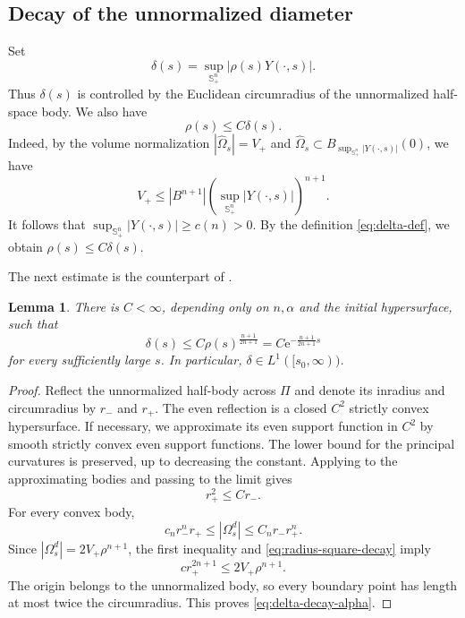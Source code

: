 \documentclass[11pt, reqno]{amsart}
\newtheorem{lemma}[theorem]{Lemma}
\theoremstyle{remark}
\theoremstyle{definition}
\numberwithin{equation}{section}
\newcommand{\Sph}{\mathbb S}
\newcommand{\PiH}{\Pi}
\begin{document}
\subsection{Decay of the unnormalized diameter}
\label{sub5.2}
Set
\begin{equation}\label{eq:delta-def}
        \delta(s)=\sup_{\Sph^n_+}|\rho(s)Y(\cdot,s)|.
\end{equation}
Thus $\delta(s)$ is controlled by the Euclidean circumradius of the
unnormalized half-space body. We also have
\begin{equation*}
    \rho(s)\leq C\delta(s).
\end{equation*}
Indeed, by the volume normalization $|\widehat\Omega_s|=V_+$ and  $ \widehat\Omega_s
 \subset  B_{\sup_{\mathbb S^n_+}|Y(\cdot,s)|}(0)$, 
we have
\begin{equation*}
 V_+
 \leq
 |B^{n+1}|
 \left(\sup_{\mathbb S^n_+}|Y(\cdot,s)|\right)^{n+1}.
\end{equation*}
It follows that $ \sup_{\mathbb S^n_+}|Y(\cdot,s)|
 \geq c(n)>0$.  
By the definition \eqref{eq:delta-def}, 
we obtain $\rho(s)\leq C\delta(s)$.

The next estimate is the counterpart of
\cite[(4.11)]{CH2024}.

\begin{lemma}\label{lem:delta-decay-alpha}
There is $C<\infty$, depending only on $n,\alpha$ and the initial hypersurface,
such that
\begin{equation}\label{eq:delta-decay-alpha}
        \delta(s)\le C\rho(s)^{\frac{n+1}{2n+1}}
        =C\mathrm{e}^{-\frac{n+1}{2n+1}s}
\end{equation}
for every sufficiently large $s$.  In particular,
$\delta\in L^1([s_0,\infty))$.
\end{lemma}

\begin{proof}
Reflect the unnormalized half-body across $\PiH$ and denote its inradius and
circumradius by $r_-$ and $r_+$.  The even reflection is a closed $C^2$ strictly convex hypersurface.
If necessary, we approximate its even support function in $C^2$ by
smooth strictly convex even support functions. The lower bound for
the principal curvatures is preserved, up to decreasing the constant.
Applying \cite[Lemma~2.2]{CW00} to the approximating bodies and
passing to the limit gives
\begin{equation}\label{eq:radius-square-decay}
        r_+^2\le Cr_-.
\end{equation}
For every convex body,
\begin{equation*}
        c_n r_-^n r_+\le |\Omega^d_s|\le C_n r_-r_+^n.
\end{equation*}
Since $|\Omega^d_s|=2V_+\rho^{n+1}$, the first inequality and
\eqref{eq:radius-square-decay} imply
\begin{equation*}
        c r_+^{2n+1}\le 2V_+\rho^{n+1}.
\end{equation*}
The origin belongs to the unnormalized body, so every boundary point has
length at most twice the circumradius. This proves
\eqref{eq:delta-decay-alpha}.
\end{proof}
\end{document}
